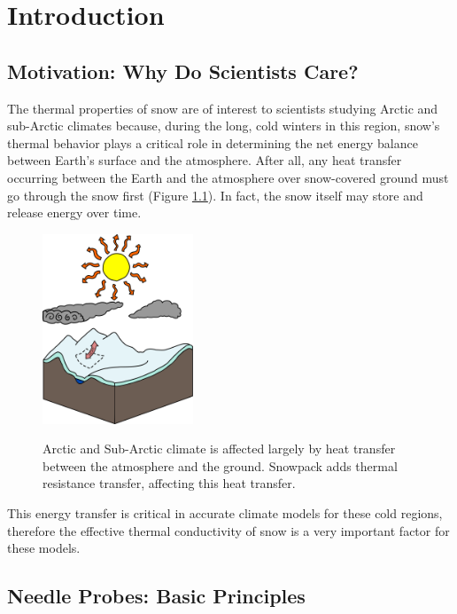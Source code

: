 \chapter{Introduction}
\label{sec:introduction}
\bigskip

\section{Motivation: Why Do Scientists Care?}
\label{sec:introduction:motivation}


The thermal properties of snow are of interest to scientists studying Arctic and
sub-Arctic climates because, during the long, cold winters in this region,
snow's thermal behavior plays a critical role in determining the net energy
balance between Earth's surface and the atmosphere. After all, any heat transfer
occurring between the Earth and the atmosphere over snow-covered ground must go
through the snow first (Figure \ref{fig:climate}). In fact, the snow
itself may store and release energy over time.

\begin{figure}[h]
\centering
\includegraphics[width=0.4\textwidth]{fig/climate.png}
\label{fig:climate}
\caption{Arctic and Sub-Arctic climate is affected largely by heat transfer
between the atmosphere and the ground. Snowpack adds thermal resistance
transfer, affecting this heat transfer.}
\end{figure}

This energy transfer is critical in accurate climate models for these cold
regions, therefore the effective thermal conductivity of snow is a very
important factor for these models.


\section{Needle Probes: Basic Principles}
\label{sec:introduction:needles}

